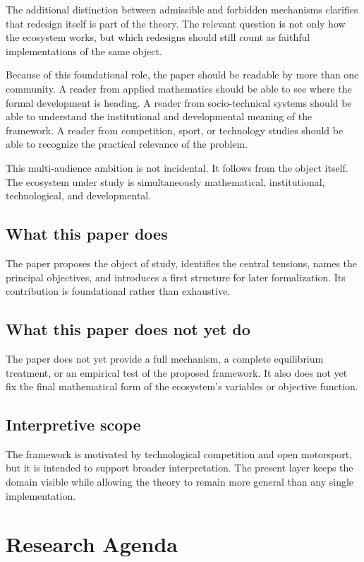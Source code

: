 \documentclass[11pt]{article}
\begin{document}
The additional distinction between admissible and forbidden mechanisms clarifies that redesign itself is part of the theory. The relevant question is not only how the ecosystem works, but which redesigns should still count as faithful implementations of the same object.

Because of this foundational role, the paper should be readable by more than one community. A reader from applied mathematics should be able to see where the formal development is heading. A reader from socio-technical systems should be able to understand the institutional and developmental meaning of the framework. A reader from competition, sport, or technology studies should be able to recognize the practical relevance of the problem.

This multi-audience ambition is not incidental. It follows from the object itself. The ecosystem under study is simultaneously mathematical, institutional, technological, and developmental.

\subsection{What this paper does}

The paper proposes the object of study, identifies the central tensions, names the principal objectives, and introduces a first structure for later formalization. Its contribution is foundational rather than exhaustive.

\subsection{What this paper does not yet do}

The paper does not yet provide a full mechanism, a complete equilibrium treatment, or an empirical test of the proposed framework. It also does not yet fix the final mathematical form of the ecosystem's variables or objective function.

\subsection{Interpretive scope}

The framework is motivated by technological competition and open motorsport, but it is intended to support broader interpretation. The present layer keeps the domain visible while allowing the theory to remain more general than any single implementation.

\section{Research Agenda}
\end{document}

